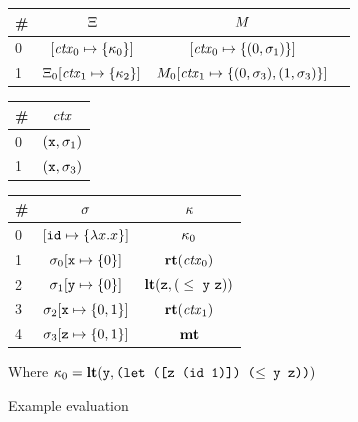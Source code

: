 \begin{figure}
\begin{tabular}{c}
      \end{tabular}
      \begin{center}
      \begin{tabular}{|l|c|c|c|}
        \hline
        \# & $\Xi$ & $M$ \\
        \hline
        0  & $[\mathit{ctx}_0 \mapsto \{ \kappa_0 \}]$ & $[\mathit{ctx}_0 \mapsto \{ (0,\sigma_1) \}]$ \\
        1  & $\Xi_0[\mathit{ctx}_1 \mapsto \{ \kappa_2 \}]$ & $M_0[\mathit{ctx}_1 \mapsto \{ (0,\sigma_3),(1,\sigma_3) \}]$ \\
        \hline
        \end{tabular}
      \begin{tabular}{|l|c|}
        \hline
        \# & $\mathit{ctx}$ \\
        \hline
        0  & $({\tt x}, \sigma_1)$ \\
        1  & $({\tt x}, \sigma_3)$ \\
        \hline
      \end{tabular}
      \begin{tabular}{|l|c|c|}
        \hline
        \# & $\sigma$ & $\kappa$ \\
        \hline
        0 & $[{\tt id} \mapsto \{ \lambda{} x. x \}]$ & $\kappa_0$ \\
        1 & $\sigma_0[{\tt x} \mapsto \{ 0 \}]$ & $\mathbf{rt}(\mathit{ctx}_0)$ \\
        2 & $\sigma_1[{\tt y} \mapsto \{ 0 \}]$ & $\mathbf{lt}({\tt z}, {\tt (}\le\ {\tt y}\ {\tt z)})$ \\
        3 & $\sigma_2[{\tt x} \mapsto \{ 0,1 \}]$ & $\mathbf{rt}(\mathit{ctx}_1)$ \\
        4 & $\sigma_3[{\tt z} \mapsto \{ 0,1 \}]$ & $\mathbf{mt}$ \\
        \hline
      \end{tabular}
      \end{center}
      Where $\kappa_0 = \mathbf{lt}(\texttt{y}, \texttt{(let ([z (id 1)]) ($\le$ y z))})$
      \caption{Example evaluation}
      \label{fig:ex-eval}
\end{figure}
